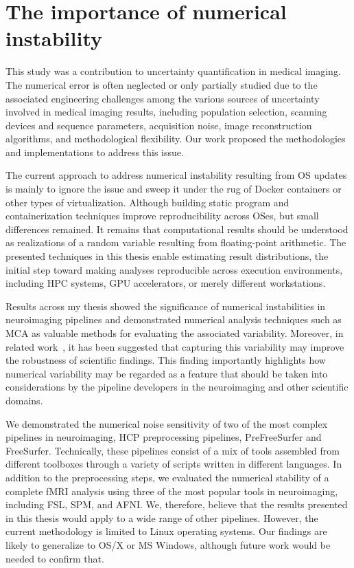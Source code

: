 \section{The importance of numerical instability}

This study was a contribution to uncertainty quantification in medical imaging.
The numerical error is often neglected or only partially studied due to the associated engineering challenges among
the various sources of uncertainty involved in medical imaging results, including population selection,
scanning devices and sequence parameters, acquisition noise, image reconstruction algorithms, and methodological flexibility.
Our work proposed the methodologies and implementations to address this issue.

The current approach to address numerical instability resulting from OS
updates is mainly to ignore the issue and sweep it under the rug of %
Docker containers or other types of virtualization. 
Although building static program and containerization techniques improve
reproducibility across OSes, but small differences remained.
It remains that computational results should be understood as realizations of a random variable resulting
from floating-point arithmetic. The presented techniques in this thesis enable estimating
result distributions, the initial step toward making analyses reproducible across
execution environments, including HPC systems, GPU accelerators, or merely
different workstations.

Results across my thesis showed the significance of numerical instabilities in neuroimaging pipelines
and demonstrated numerical analysis techniques such as MCA as valuable methods for evaluating the associated variability. 
Moreover, in related work~\cite{kiar2020numerical}, it has been suggested that capturing this variability may improve the robustness of scientific
findings. This finding importantly highlights how numerical variability may be regarded as a feature that should be
taken into considerations by the pipeline developers in the neuroimaging and other scientific domains.

We demonstrated the numerical noise sensitivity of two of the most complex pipelines in neuroimaging,
HCP preprocessing pipelines, PreFreeSurfer and FreeSurfer. Technically, these pipelines consist of a mix of tools
assembled from different toolboxes through a variety of scripts written in different languages. In addition to the preprocessing steps,
we evaluated the numerical stability of a complete fMRI analysis using three of the most popular tools in neuroimaging, including FSL, SPM, and AFNI.
We, therefore, believe that the results presented in this thesis would apply to a wide range of other pipelines. 
However, the current methodology is limited to Linux operating systems. 
Our findings are likely to generalize to OS/X or MS Windows, although future work would be needed to confirm that.

